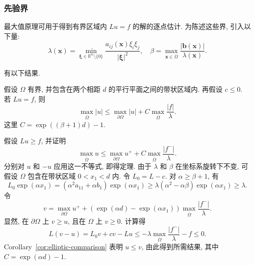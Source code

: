 \subsubsection{先验界}\label{subsec:elliptic-a-priori-bounds}

最大值原理可用于得到有界区域内 $Lu=f$ 的解的逐点估计. 为陈述这些界, 引入以下量:
\begin{equation}\label{eq:elliptic-pointwise-ellipticity-and-drift}
\lambda(\bm{x})=\min_{\bm{\xi}\in\mathbb{R}^n\setminus\{0\}}\dfrac{a_{ij}(\bm{x})\xi_i\xi_j}{|\bm{\xi}|^2},\quad\beta=\max_{\bm{x}\in\overline\Omega}\dfrac{|\bm{b}(\bm{x})|}{\lambda(\bm{x})}.
\end{equation}


有以下结果.

\begin{Theorem}
\label{thm:elliptic-strip-a-priori-bound}
假设 $\Omega$ 有界, 并包含在两个相距 $d$ 的平行平面之间的带状区域内. 再假设 $c\leq0$. 若 $Lu=f$, 则
\begin{equation}\label{eq:elliptic-strip-a-priori-bound}
\max_{\overline\Omega}|u|\leq\max_{\partial\Omega}|u|+C\max_{\overline\Omega}\dfrac{|f|}{\lambda}.
\end{equation}
这里 $C=\exp((\beta+1)d)-1$.
\end{Theorem}

\begin{Proof}
假设 $Lu\geq f$, 并证明
\begin{equation}\label{eq:elliptic-strip-upper-bound}
\max_{\overline\Omega}u\leq\max_{\partial\Omega}u^++C\max_{\overline\Omega}\dfrac{|f^-|}{\lambda}.
\end{equation}
分别对 $u$ 和 $-u$ 应用这一不等式, 即得定理. 由于 $\lambda$ 和 $\beta$ 在坐标系旋转下不变, 可假设 $\Omega$ 包含在带状区域 $0<x_1<d$ 内. 令 $L_0=L-c$. 对 $\alpha\geq\beta+1$, 有
\begin{equation}\label{eq:elliptic-strip-exponential-barrier}
L_0\exp(\alpha x_1)=(\alpha^2a_{11}+\alpha b_1)\exp(\alpha x_1)\geq\lambda(\alpha^2-\alpha\beta)\exp(\alpha x_1)\geq\lambda.
\end{equation}
令
\begin{equation}\label{eq:elliptic-strip-comparison-function}
v=\max_{\partial\Omega}u^++(\exp(\alpha d)-\exp(\alpha x_1))\max_{\overline\Omega}\dfrac{|f^-|}{\lambda}.
\end{equation}
显然, 在 $\partial\Omega$ 上 $v\geq u$, 且在 $\Omega$ 上 $v\geq0$. 计算得
\begin{equation}\label{eq:elliptic-strip-comparison-inequality}
L(v-u)=L_0v+cv-Lu\leq-\lambda\max_{\overline\Omega}\dfrac{|f^-|}{\lambda}-f\leq0.
\end{equation}
Corollary~\ref{cor:elliptic-comparison} 表明 $u\leq v$, 由此得到所需结果, 其中 $C=\exp(\alpha d)-1$.
\end{Proof}

